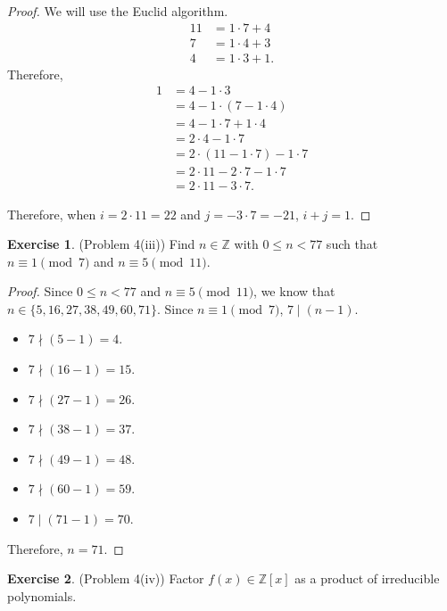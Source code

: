 \documentclass[12pt, psamsfonts]{amsart}
\theoremstyle{definition}
\newtheorem*{exer}{Exercise}
\theoremstyle{remark}
\numberwithin{equation}{section}
\begin{document}
\begin{proof}
  We will use the Euclid algorithm.
  \begin{align*}
    11 &= 1 \cdot 7 + 4 \\
    7 &= 1 \cdot 4 + 3 \\
    4 &= 1 \cdot 3 + 1.
  \end{align*}
  Therefore,
  \begin{align*}
    1 &= 4 - 1 \cdot 3 \\
      &= 4 - 1 \cdot (7 - 1 \cdot 4) \\
      &= 4 - 1 \cdot 7 + 1 \cdot 4 \\
      &= 2 \cdot 4 - 1 \cdot 7 \\
      &= 2 \cdot (11 - 1 \cdot 7) - 1 \cdot 7 \\
      &= 2 \cdot 11 - 2 \cdot 7 - 1 \cdot 7 \\
      &= 2 \cdot 11 - 3 \cdot 7.
  \end{align*}

  Therefore, when $i = 2 \cdot 11 = 22$ and $j = -3 \cdot 7 = -21$, $i + j = 1$.
\end{proof}

\begin{exer}{(Problem 4(iii))}
  Find $n \in \mathbb{Z}$ with $0 \leq n < 77$ such that $n \equiv 1 \pmod 7$ and $n \equiv 5 \pmod{11}$.
\end{exer}

\begin{proof}
  Since $0 \leq n < 77$ and $n \equiv 5 \pmod{11}$, we know that $n \in \{ 5, 16, 27, 38, 49, 60, 71 \}$.
  Since $n \equiv 1 \pmod 7$, $7 \mid (n - 1)$.
  \begin{itemize}
    \item $7 \nmid (5 - 1) = 4$.
    \item $7 \nmid (16 - 1) = 15$.
    \item $7 \nmid (27 - 1) = 26$.
    \item $7 \nmid (38 - 1) = 37$.
    \item $7 \nmid (49 - 1) = 48$.
    \item $7 \nmid (60 - 1) = 59$.
    \item $7 \mid (71 - 1) = 70$.
  \end{itemize}
  Therefore, $n = 71$.
\end{proof}

\begin{exer}{(Problem 4(iv))}
  Factor $f(x) \in \mathbb{Z}[x]$ as a product of irreducible polynomials.
\end{exer}
\end{document}
